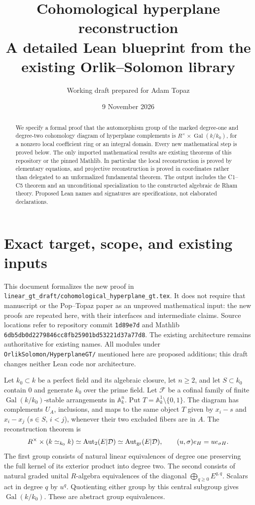 \documentclass[11pt]{article}
\title{Cohomological hyperplane reconstruction\\
\large A detailed Lean blueprint from the existing Orlik--Solomon library}
\author{Working draft prepared for Adam Topaz}
\date{9 November 2026}
\theoremstyle{remark}\newtheorem{remark}[theorem]{Remark}
\newcommand{\A}{\mathbb A}
\newcommand{\cD}{\mathcal D}
\newcommand{\Aut}{\operatorname{Aut}}
\newcommand{\Gal}{\operatorname{Gal}}
\newcommand{\code}[1]{\nolinkurl{#1}}
\begin{document}
\maketitle
\begin{abstract}
We specify a formal proof that the automorphism group of the marked
degree-one and degree-two cohomology diagram of hyperplane complements is
$R^\times\times\Gal(k/k_0)$, for a nonzero local coefficient ring or an
integral domain. Every new mathematical step is proved below. The only
imported mathematical results are existing theorems of this repository
or the pinned Mathlib. In particular the local reconstruction is proved
by elementary equations, and projective reconstruction is proved in
coordinates rather than delegated to an unformalized fundamental theorem.
The output includes the C1--C5 theorem and an unconditional specialization
to the constructed algebraic de Rham theory. Proposed Lean names and
signatures are specifications, not elaborated declarations.
\end{abstract}
\tableofcontents
\newpage

\section{Exact target, scope, and existing inputs}
\label{sec:boundary}

This document formalizes the new proof in
\code{linear_gt_draft/cohomological_hyperplane_gt.tex}. It does not require
that manuscript or the Pop--Topaz paper as an unproved mathematical input:
the new proofs are repeated here, with their interfaces and intermediate
claims. Source locations refer to repository commit \code{1d89e7d}
and Mathlib \code{6db5db0d2279846cc8fb25901bd53221d37a77d8}.
The existing architecture remains authoritative for existing names.
All modules under \code{OrlikSolomon/HyperplaneGT/} mentioned here are
proposed additions; this draft changes neither Lean code nor architecture.

Let $k_0\subset k$ be a perfect field and its algebraic closure, let
$n\geq2$, and let $S\subset k_0$ contain $0$ and generate $k_0$ over
the prime field. Let $\mathscr F$ be a cofinal family of finite
$\Gal(k/k_0)$-stable arrangements in $\A^n_k$. Put
$T=\A^1_k\setminus\{0,1\}$. The diagram has complements $U_A$,
inclusions, and maps to the same object $T$ given by $x_i-s$ and
$x_i-x_j$ ($s\in S$, $i<j$), whenever their two excluded fibers are
in $A$. The reconstruction theorem is
\[
 R^\times\times(k\simeq_{k_0}k)
 \simeq\Aut_2(E|\cD)\simeq\Aut_{\rm gr}(E|\cD),
 \qquad (u,\sigma)e_H=u e_{\sigma H}.
\]
The first group consists of natural linear equivalences of degree one
preserving the full kernel of its exterior product into degree two.
The second consists of natural graded unital $R$-algebra equivalences
of the diagonal $\bigoplus_{q\geq0}E^{q,q}$. Scalars act in degree $q$
by $u^q$. Quotienting either group by this central subgroup gives
$\Gal(k/k_0)$. These are abstract group equivalences.
\end{document}
